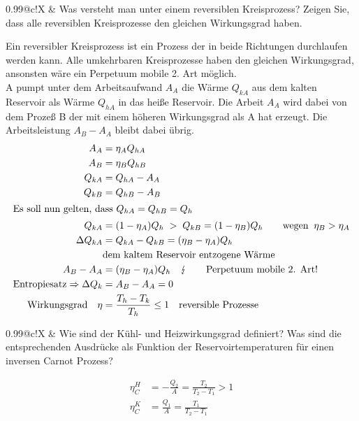 \documentclass[a4paper,12pt]{scrartcl}
\makeatletter
\newcounter{qc}\setcounter{qc}{1}
\newenvironment{fshaded}{
\def\FrameCommand{\fcolorbox{framecolor}{shadecolor}}
\MakeFramed {\FrameRestore}}
{\endMakeFramed}
\def\frage#1{
\begin{fshaded}
\noindent
\begin{tabularx}{0.99\textwidth}{@{}c!{\color{framecolor}\vline}X}
{ \bf \rm \theqc }	&	\noindent #1
\end{tabularx}
\stepcounter{qc}
\end{fshaded}
}
\makeatother
\begin{document}
\frage{Was versteht man unter einem reversiblen Kreisprozess? Zeigen Sie, dass alle reversiblen Kreisprozesse den gleichen 
Wirkungsgrad haben.}
\noindent
Ein reversibler Kreisprozess ist ein Prozess der in beide Richtungen durchlaufen werden kann.
Alle umkehrbaren Kreisprozesse haben den gleichen Wirkungsgrad, ansonsten wäre ein Perpetuum mobile 2. Art möglich.\\
A pumpt unter dem Arbeitsaufwand $A_A$ die Wärme $Q_{kA}$ aus dem kalten Reservoir als Wärme $Q_{hA}$ in das heiße 
Reservoir. Die Arbeit $A_A$ wird dabei von dem Prozeß B der mit einem höheren Wirkungsgrad als A hat erzeugt. Die Arbeitsleistung $A_B-A_A$ bleibt dabei übrig.
	\begin{align*}
		A_A&=\eta_AQ_{hA}\\
		A_B&=\eta_BQ_{hB}\\
		Q_{kA}&=Q_{hA}-A_A\\
		Q_{kB}&=Q_{hB}-A_B\\		
	\intertext{Es soll nun gelten, dass $Q_{hA}=Q_{hB}=Q_h$}
		Q_{kA}&=(1-\eta_A)Q_h \; >\; Q_{kB}=(1-\eta_B)Q_h\qquad\text{wegen}\;\; \eta_B>\eta_A\\
		\Delta{Q_{kA}}&=Q_{kA}-Q_{kB}=(\eta_B-\eta_A)Q_h \\
		&\text{dem kaltem Reservoir entzogene Wärme}\\
		A_B-A_A&=(\eta_B-\eta_A)Q_h \quad\lightning\qquad\text{Perpetuum mobile 2. Art!}\\
		\text{Entropiesatz} \Rightarrow \Delta Q_{k}&=A_B-A_A=0\\
		\text{Wirkungsgrad} \quad\eta&=\frac{T_h-T_k}{T_h}\leq{1}\quad \text{reversible Prozesse}\\
	\end{align*}	
	
\frage{Wie sind der Kühl- und Heizwirkungsgrad definiert? Was sind die entsprechenden Ausdrücke als Funktion der 
Reservoirtemperaturen für einen inversen Carnot Prozess?}
\noindent
	\begin{align*}
		\eta_C^H&=-\frac{Q_2}{A}=\frac{T_2}{T_2-T_1}>1\\
		\eta_C^K&=\frac{Q_1}{A}=\frac{T_1}{T_2-T_1}
	\end{align*}
\end{document}
